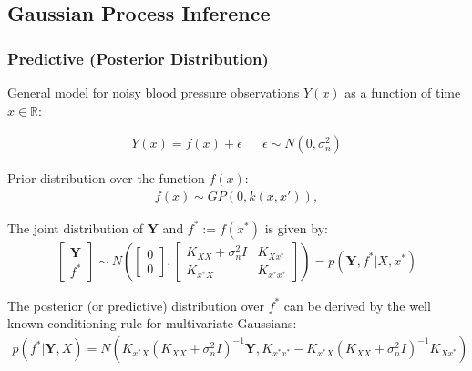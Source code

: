 \documentclass[
	9pt, %
]{beamer}
\begin{document}
\subsection{Gaussian Process Inference}

\begin{frame}
	\frametitle{Predictive (Posterior Distribution)}

	General model for noisy blood pressure observations $Y(x)$ as a function of time $x \in \mathbb{R}$:

	\begin{align*}
		Y(x) = f(x) + \epsilon && \epsilon \sim N(0, \sigma_n^{2})
	\end{align*}


Prior distribution over the function $f(x)$:
\begin{gather*}
    f(x) \sim GP(0, k(x, x')),
\end{gather*}


The joint distribution of $\mathbf{Y}$ and $f^{\ast} := f(x^{\ast})$ is given by:
\begin{gather}
    \begin{bmatrix}
        \mathbf{Y} \\
        f^{\ast}
    \end{bmatrix}
    \sim N \left(
        \begin{bmatrix}
        0 \\
        0
        \end{bmatrix},
        \begin{bmatrix}
        K_{XX} + \sigma_n^2 I & K_{Xx^{\ast}} \\
        K_{x^{\ast}X} & K_{x^{\ast}x^{\ast}}
        \end{bmatrix}
        \right)
    = p(\mathbf{Y}, f^{\ast}| X, x^{\ast})
\end{gather}


The posterior (or predictive) distribution over $f^{\ast}$ can be derived by the well known conditioning rule for
	multivariate Gaussians:
\begin{gather}
    p(f^{\ast}| \mathbf{Y}, X) = N(
K_{x^{\ast}X} (K_{XX} + \sigma_n^2 I)^{-1} \mathbf{Y},
K_{x^{\ast}x^{\ast}} - K_{x^{\ast}X}(K_{XX} + \sigma_n^2 I)^{-1}K_{Xx^{\ast}})
\end{gather}



\end{frame}
\end{document}
